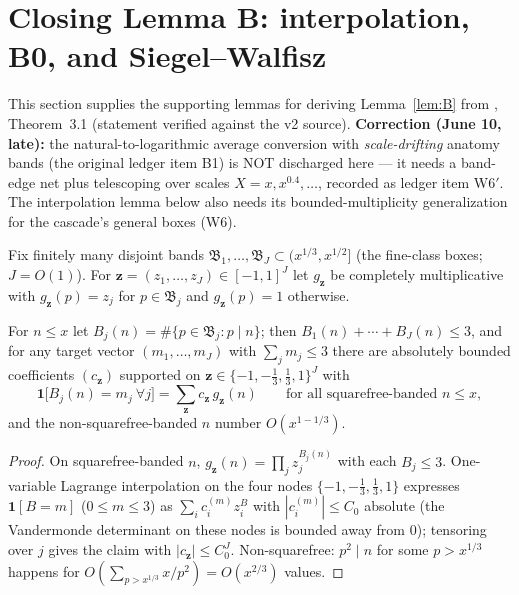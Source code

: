 \section{Closing Lemma B: interpolation, B0, and Siegel--Walfisz}
\label{sec:lemmaB-closure}

This section supplies the supporting lemmas for deriving
Lemma~\ref{lem:B} from \cite{TT25}, Theorem~3.1 (statement verified
against the v2 source). \textbf{Correction (June 10, late):} the
natural-to-logarithmic average conversion with \emph{scale-drifting}
anatomy bands (the original ledger item B1) is NOT discharged here ---
it needs a band-edge net plus telescoping over scales
$X=x,x^{0.4},\ldots$, recorded as ledger item W6$'$. The interpolation
lemma below also needs its bounded-multiplicity generalization for the
cascade's general boxes (W6).

Fix finitely many disjoint bands
$\mathfrak B_1,\ldots,\mathfrak B_J\subset(x^{1/3},x^{1/2}]$ (the
fine-class boxes; $J=O(1)$). For $\mathbf z=(z_1,\ldots,z_J)\in[-1,1]^J$
let $g_{\mathbf z}$ be completely multiplicative with
$g_{\mathbf z}(p)=z_j$ for $p\in\mathfrak B_j$ and $g_{\mathbf z}(p)=1$
otherwise.

\begin{lemma}[$z$-interpolation]\label{lem:interp}
\statusP\quad
For $n\le x$ let $B_j(n)=\#\{p\in\mathfrak B_j:p\mid n\}$; then
$B_1(n)+\cdots+B_J(n)\le3$, and for any target vector
$(m_1,\ldots,m_J)$ with $\sum_jm_j\le3$ there are absolutely bounded
coefficients $(c_{\mathbf z})$ supported on
$\mathbf z\in\{-1,-\tfrac13,\tfrac13,1\}^J$ with
\[
\mathbf 1\big[B_j(n)=m_j\ \forall j\big]
=\sum_{\mathbf z}c_{\mathbf z}\,g_{\mathbf z}(n)
\qquad\text{for all squarefree-banded }n\le x,
\]
and the non-squarefree-banded $n$ number $O(x^{1-1/3})$.
\end{lemma}

\begin{proof}
On squarefree-banded $n$,
$g_{\mathbf z}(n)=\prod_jz_j^{B_j(n)}$ with each $B_j\le3$. One-variable
Lagrange interpolation on the four nodes $\{-1,-\tfrac13,\tfrac13,1\}$
expresses $\mathbf 1[B=m]$ ($0\le m\le3$) as
$\sum_ic_i^{(m)}z_i^{B}$ with $|c_i^{(m)}|\le C_0$ absolute (the
Vandermonde determinant on these nodes is bounded away from $0$);
tensoring over $j$ gives the claim with
$|c_{\mathbf z}|\le C_0^J$. Non-squarefree: $p^2\mid n$ for some
$p>x^{1/3}$ happens for $O(\sum_{p>x^{1/3}}x/p^2)=O(x^{2/3})$ values.
\end{proof}

